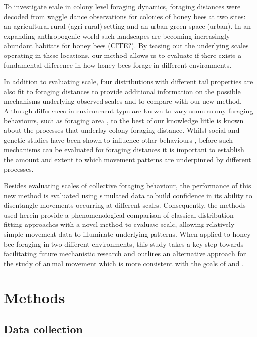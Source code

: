 \documentclass[11pt,usenames,dvipsnames,a4paper]{article}
\begin{document}
\begin{linenumbers}
To investigate scale in colony level foraging dynamics, foraging distances were decoded from waggle dance observations for colonies of honey bees at two sites: an agricultural-rural (agri-rural) setting and an urban green space (urban). In an expanding anthropogenic world such landscapes are becoming increasingly abundant habitats for honey bees (CITE?). By teasing out the underlying scales operating in these locations, our method allows us to evaluate if there exists a fundamental difference in how honey bees forage in different environments. 

In addition to evaluating scale, four distributions with different tail properties are also fit to foraging distances to provide additional information on the possible mechanisms underlying observed scales and to compare with our new method. Although differences in environment type are known to vary some colony foraging behaviours, such as foraging area \citep{Lecocq2015, Samuelson2018}, to the best of our knowledge little is known about the processes that underlay colony foraging distance. Whilst social and genetic studies have been shown to influence other behaviours \citep{Fewell1993, Page1998, Sherman2002, Jones2004, Gruter2009}, before such mechanisms can be evaluated for foraging distances it is important to establish the amount and extent to which movement patterns are underpinned by different processes.

Besides evaluating scales of collective foraging behaviour, the performance of this new method is evaluated using simulated data to build confidence in its ability to disentangle movements occurring at different scales. Consequently, the methods used herein provide a phenomenological comparison of classical distribution fitting approaches with a novel method to evaluate scale, allowing relatively simple movement data to illuminate underlying patterns. When applied to honey bee foraging in two different environments, this study takes a key step towards facilitating future mechanistic research and outlines an alternative approach for the study of animal movement which is more consistent with the goals of \cite{Nathan2008} and \cite{Patterson2017}.
\end{linenumbers}
	
\section{Methods}

\subsection{Data collection}
\end{document}
